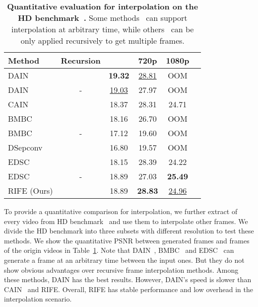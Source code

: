 \documentclass[10pt,twocolumn,letterpaper]{article}
\def\red#1{\textcolor{MyRed}{#1}}
\def\blue#1{\textcolor{MyBlue}{#1}}
\def\first#1{\red{\textbf{#1}}}
\def\second#1{\blue{\underline{#1}}}
\begin{document}
\begin{table}[t]
	\caption{\textbf{Quantitative evaluation for  interpolation on the HD benchmark~\cite{bao2019memc}.} Some methods~\cite{bao2019depth, park2020bmbc, cheng2020multiple} can support interpolation at arbitrary time, while others~\cite{choi2020channel, cheng2020video} can be only applied recursively to get multiple frames. }\label{tab:hd8}
	\centering
	\small
	\begin{tabular}{lccccc}
		\hline
		Method & Recursion && 720p & 1080p\\ \hline
		DAIN~\cite{bao2019depth} & \checkmark & \first{19.32} &     \second{28.81} & OOM \\
		DAIN~\cite{bao2019depth} & - & \second{19.03} &     27.97 & OOM \\
		CAIN~\cite{choi2020channel} & \checkmark & 18.37 & 28.31 & 24.71 \\
		BMBC~\cite{park2020bmbc} & \checkmark & 18.16 & 26.70 & OOM\\
		BMBC~\cite{park2020bmbc} & - & 17.12 & 19.60 & OOM 
	    \\ 
	    DSepconv~\cite{cheng2020video} & \checkmark & 16.80 & 19.57 & OOM\\
		EDSC~\cite{cheng2020multiple} & \checkmark & 18.15 & 28.39 & 24.22\\
		EDSC~\cite{cheng2020multiple} & - & 18.89 & 27.03 & \first{25.49}\\
		\hline
		RIFE (Ours) & \checkmark & 18.89 & \first{28.83} & \second{24.96}\\ \hline
	\end{tabular}
	\normalsize
	\vspace{-1em}
\end{table}

To provide a quantitative comparison for  interpolation, we further extract  of every video from HD benchmark~\cite{bao2019memc} and use them to interpolate other frames. We divide the HD benchmark into three subsets with different resolution to test these methods. We show the quantitative PSNR between generated frames and frames of the origin videos in Table~\ref{tab:hd8}. Note that DAIN~\cite{bao2019depth}, BMBC~\cite{park2020bmbc} and EDSC~\cite{cheng2020video} can generate a frame at an arbitrary time between the input ones. But they do not show obvious advantages over recursive frame interpolation methods. Among these methods, DAIN has the best results. However, DAIN's speed is slower than CAIN~\cite{choi2020channel} and RIFE. Overall, RIFE has stable performance and low overhead in the  interpolation scenario. 
\end{document}
